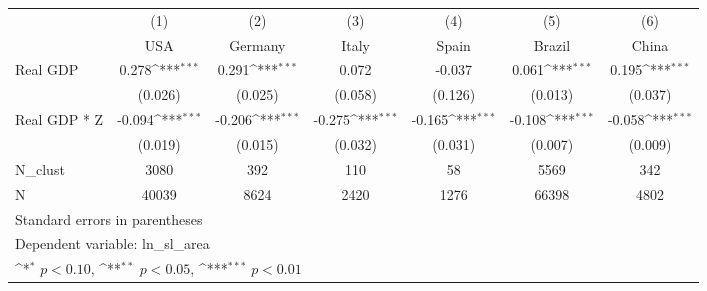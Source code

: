 {
\def\sym#1{\ifmmode^{#1}\else\(^{#1}\)\fi}
\begin{tabular}{l*{6}{c}}
\hline\hline
            &\multicolumn{1}{c}{(1)}&\multicolumn{1}{c}{(2)}&\multicolumn{1}{c}{(3)}&\multicolumn{1}{c}{(4)}&\multicolumn{1}{c}{(5)}&\multicolumn{1}{c}{(6)}\\
            &\multicolumn{1}{c}{USA}&\multicolumn{1}{c}{Germany}&\multicolumn{1}{c}{Italy}&\multicolumn{1}{c}{Spain}&\multicolumn{1}{c}{Brazil}&\multicolumn{1}{c}{China}\\
\hline
Real GDP    &       0.278\sym{***}&       0.291\sym{***}&       0.072         &      -0.037         &       0.061\sym{***}&       0.195\sym{***}\\
            &     (0.026)         &     (0.025)         &     (0.058)         &     (0.126)         &     (0.013)         &     (0.037)         \\
[1em]
Real GDP * Z&      -0.094\sym{***}&      -0.206\sym{***}&      -0.275\sym{***}&      -0.165\sym{***}&      -0.108\sym{***}&      -0.058\sym{***}\\
            &     (0.019)         &     (0.015)         &     (0.032)         &     (0.031)         &     (0.007)         &     (0.009)         \\
\hline
N\_clust     &        3080         &         392         &         110         &          58         &        5569         &         342         \\
N           &       40039         &        8624         &        2420         &        1276         &       66398         &        4802         \\
\hline\hline
\multicolumn{7}{l}{\footnotesize Standard errors in parentheses}\\
\multicolumn{7}{l}{\footnotesize Dependent variable: ln\_sl\_area}\\
\multicolumn{7}{l}{\footnotesize \sym{*} \(p<0.10\), \sym{**} \(p<0.05\), \sym{***} \(p<0.01\)}\\
\end{tabular}
}
